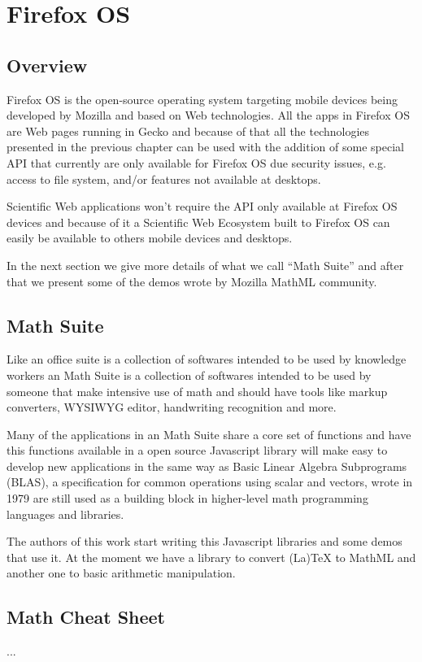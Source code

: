 \chapter{Firefox OS}

\section{Overview}

Firefox OS is the open-source operating system targeting mobile devices being
developed by Mozilla and based on Web technologies. All the apps in Firefox OS
are Web pages running in Gecko and because of that all the technologies
presented in the previous chapter can be used with the addition of some special
API that currently are only available for Firefox OS due security issues, e.g.
access to file system, and/or features not available at desktops.

Scientific Web applications won't require the API only available at Firefox OS
devices and because of it a Scientific Web Ecosystem built to Firefox OS can
easily be available to others mobile devices and desktops.

In the next section we give more details of what we call ``Math Suite'' and
after that we present some of the demos wrote by Mozilla MathML community.

\section{Math Suite}

Like an office suite is a collection of softwares intended to be used by
knowledge workers an Math Suite is a collection of softwares intended to be used
by someone that make intensive use of math and should have tools like markup
converters, WYSIWYG editor, handwriting recognition and more.

Many of the applications in an Math Suite share a core set of functions and have
this functions available in a open source Javascript library will make easy to
develop new applications in the same way as Basic Linear Algebra Subprograms
(BLAS), a specification for common operations using scalar and vectors, wrote in
1979 are still used as a building block in higher-level math programming
languages and libraries.

The authors of this work start writing this Javascript libraries
and some demos that use it. At the moment we have a library to convert (La)TeX
to MathML and another one to basic arithmetic manipulation.

\section{Math Cheat Sheet}

...
